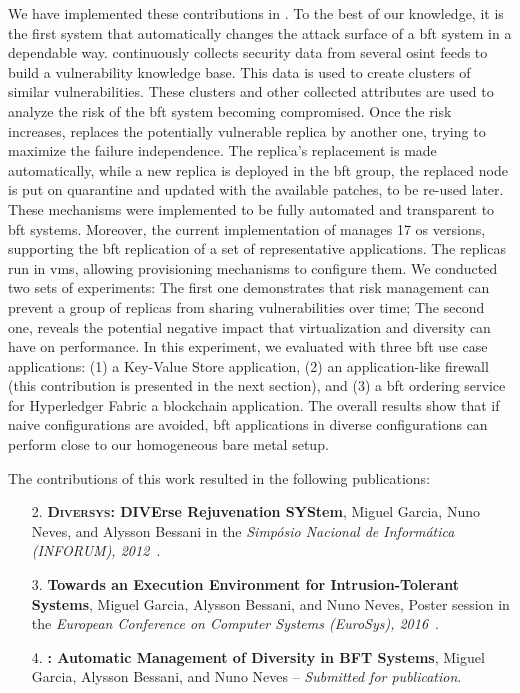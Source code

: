 We have implemented these contributions in \system.
To the best of our knowledge, it is the first system that automatically changes the attack surface of a \gls{bft} system in a dependable way.
\system continuously collects security data from several \gls{osint} feeds to build a vulnerability knowledge base.
This data is used to create clusters of similar vulnerabilities.
These clusters and other collected attributes are used to analyze the risk of the \gls{bft} system becoming compromised. 
Once the risk increases, \system replaces the potentially vulnerable replica by another one, trying to maximize the failure independence. 
The replica's replacement is made automatically, while a new replica is deployed in the \gls{bft} group, the replaced node is put on quarantine and updated with the available patches, to be re-used later.
These mechanisms were implemented to be fully automated and transparent to \gls{bft} systems.
Moreover, the current implementation of \system manages 17 \gls{os} versions, supporting the \gls{bft} replication of a set of representative applications.
The replicas run in \glspl{vm}, allowing provisioning mechanisms to configure them. 
We conducted two sets of experiments: The first one demonstrates that \system risk management can prevent a group of replicas from sharing vulnerabilities over time; 
The second one, reveals the potential negative impact that virtualization and diversity can have on performance. 
In this experiment, we evaluated \system with three \gls{bft} use case applications: (1) a Key-Value Store application, (2) \sieveq an application-like firewall (this contribution is presented in the next section), and (3) a \gls{bft} ordering service for Hyperledger Fabric a blockchain application.
The overall results show that if naive configurations are avoided, \gls{bft} applications in diverse configurations can perform close to our homogeneous bare metal setup.

The contributions of this work resulted in the following publications:

\begin{enumerate}

\item[2.] \textbf{\textsc{Diversys}: DIVErse Rejuvenation SYStem}, Miguel Garcia, Nuno Neves, and  Alysson Bessani in the \emph{Simp\'{o}sio Nacional de Inform\'{a}tica (INFORUM), 2012~\cite{Garcia:2012b}}.


\item[3.] \textbf{Towards an Execution Environment for Intrusion-Tolerant Systems}, Miguel Garcia, Alysson Bessani, and Nuno Neves, Poster session in the \emph{European Conference on Computer Systems (EuroSys), 2016}~\cite{Garcia:2016b}.


\item[4.] \textbf{\system: Automatic Management of Diversity in BFT Systems}, Miguel Garcia, Alysson Bessani, and Nuno Neves -- \emph{Submitted for publication}.

\end{enumerate}


